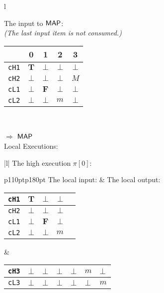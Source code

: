 \documentclass[10pt,a4paper,oneside]{article}
\def\VTRUE{\ensuremath{\textbf{T}}}
\def\VFALSE{\ensuremath{\textbf{F}}}
\def\NIL{\ensuremath{\bot}}
\def\sanserif#1{\ensuremath{\sf #1}}
\def\MAP{\ensuremath{\sanserif{MAP}}}
\def\Prog{\ensuremath{\pi}}
\def\Progl#1{\ensuremath{\Prog[#1]}}
\def\linecode#1{{\texttt{#1}}}
\begin{document}
\begin{figure}[!t]
\begin{lrbox}{\mylistingbox}\begin{tabular}{l}
\begin{minipage}{183pt}
The input to \MAP:\\
\emph{(The last input item is not consumed.)} 
\begin{tabular}{|c|c|c|c|c|}
	\hline
	\backslashbox{Channel}{Time} & 0 & 1 & 2 & 3 \\
    \hline
	\linecode{cH1} & $\VTRUE$ & \NIL & \NIL & \NIL\\
	\hline
	\linecode{cH2} & \NIL & \NIL & \NIL & $M$ \\
	\hline
	\linecode{cL1} & \NIL & \VFALSE & \NIL & \NIL\\
	\hline
	\linecode{cL2} & \NIL & \NIL & $m$ & \NIL\\
	\hline 
\end{tabular} \\
\end{minipage} $\Longrightarrow$ \MAP \\
Local Executions: \\
\begin{tabular}{|l|}
\hline
The high execution \Progl{0}:\\
\begin{tabular}{p{110pt}p{180pt}}
The local input: & The local output:\\
\begin{tabular}{|c|c|c|c|c|}
	\hline
	\linecode{cH1} & $\VTRUE$ & \NIL & \NIL \\
	\hline
	\linecode{cH2} & \NIL & \NIL & \NIL \\
	\hline
	\linecode{cL1} & \NIL & \VFALSE & \NIL \\
	\hline
	\linecode{cL2} & \NIL & \NIL & $m$ \\
	\hline
\end{tabular} & 
\begin{minipage}{180pt}
\begin{tabular}{|c|c|c|c|c|>{\centering\arraybackslash}p{25pt}|>{\centering\arraybackslash}p{25pt}|}
	\hline	
	\linecode{cH3} & \NIL & \NIL & \NIL & \NIL & $m$ & \NIL\\
	\hline
	\linecode{cL3} & \NIL & \NIL & \NIL & \NIL &  \NIL & $m$\\
	\hline 	
\end{tabular}
\vspace{25pt}
\end{minipage} \\


\end{tabular}
\end{tabular}
\end{tabular}
\end{lrbox}
\end{figure}
\end{document}
